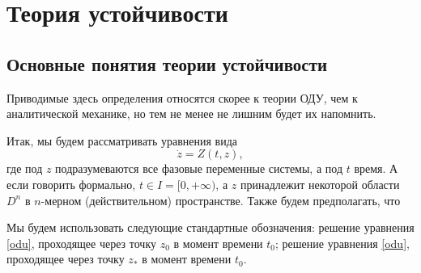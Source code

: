 \documentclass[a4paper,12pt]{article}
\newcommand{\eql}[2]{\begin{equation}\label{#2}#1\end{equation}}
\begin{document}
\section{Теория устойчивости}

\subsection{Основные понятия теории устойчивости}

Приводимые здесь определения относятся скорее к теории ОДУ, чем к аналитической механике, но тем не
менее не лишним будет их напомнить.

Итак, мы будем рассматривать уравнения вида \eql{\dot{z}=Z(t,z),}{odu} где под $z$ подразумеваются
все фазовые переменные системы, а под $t$ время. А если говорить формально, $t\in I=[0,+\infty)$,
а $z$ принадлежит некоторой области $D^n$ в $n$-мерном (действительном) пространстве. Также будем
предполагать, что

Мы будем использовать следующие стандартные обозначения:  решение
уравнения \eqref{odu}, проходящее через точку $z_0$ в момент времени $t_0$;
 решение уравнения \eqref{odu}, проходящее через точку
$z_*$ в момент времени $t_0$.
\end{document}

